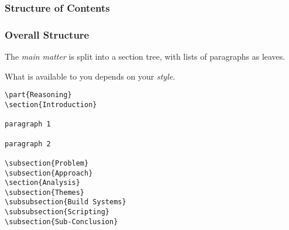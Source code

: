 \subsubsection{Structure of Contents}
\begin{frame}[fragile]
  \frametitle{Overall Structure }
  \vspace{3mm}
  The \textsl{main matter} is split into a section tree, with lists of paragraphs as leaves.
  
  \vspace{5mm}
  What is available to you depends on your \textsl{style}.
  
  \vspace{5mm}
  \begin{verbatim}
\part{Reasoning}
\section{Introduction}

paragraph 1

paragraph 2

\subsection{Problem}
\subsection{Approach}
\section{Analysis}
\subsection{Themes}
\subsubsection{Build Systems}
\subsubsection{Scripting}
\subsection{Sub-Conclusion}
  \end{verbatim}
\end{frame}

